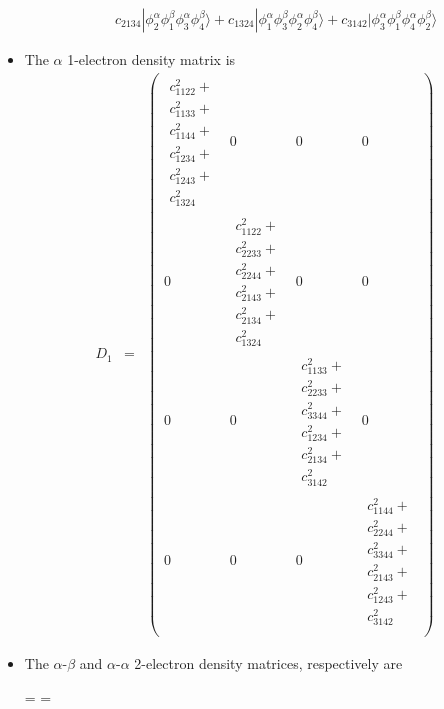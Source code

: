 \documentclass{amsart}
\begin{document}
\begin{itemize}
\begin{eqnarray}
                 &&  c_{2134}|\phi_2^\alpha\phi_1^\beta\phi_3^\alpha\phi_4^\beta\rangle + 
                        c_{1324}|\phi_1^\alpha\phi_3^\beta\phi_2^\alpha\phi_4^\beta\rangle +
                        c_{3142}|\phi_3^\alpha\phi_1^\beta\phi_4^\alpha\phi_2^\beta\rangle
         \end{eqnarray}
\item The $\alpha$ 1-electron density matrix is
         \begin{eqnarray}
         D_1 &=&
         \begin{pmatrix}
         \begin{array}{l}
         c_{1122}^2+ \\
         c_{1133}^2+ \\
         c_{1144}^2+ \\
         c_{1234}^2+ \\
         c_{1243}^2+ \\
         c_{1324}^2 
         \end{array}
         & 0 & 0 & 0 \\
         0 & 
         \begin{array}{l}
         c_{1122}^2+ \\
         c_{2233}^2+ \\
         c_{2244}^2+ \\
         c_{2143}^2+ \\
         c_{2134}^2+ \\
         c_{1324}^2
         \end{array}
         & 0 & 0 \\
         0 & 0 &
         \begin{array}{l}
         c_{1133}^2+ \\
         c_{2233}^2+ \\
         c_{3344}^2+ \\
         c_{1234}^2+ \\
         c_{2134}^2+ \\
         c_{3142}^2
         \end{array}
         & 0 \\
         0 & 0 & 0 &
         \begin{array}{l}
         c_{1144}^2+ \\
         c_{2244}^2+ \\
         c_{3344}^2+ \\
         c_{2143}^2+ \\
         c_{1243}^2+ \\
         c_{3142}^2
         \end{array} \\
         \end{pmatrix}
         \end{eqnarray}
\item The $\alpha$-$\beta$ and $\alpha$-$\alpha$ 2-electron density matrices, respectively are
         \eject
         \pdfpagewidth=16.5in
         \pdfpageheight=11.7in
         \tiny
         
         
         \normalsize
         \eject
         \pdfpagewidth=\classpagewidth
         \pdfpageheight=\classpageheight
\end{itemize}
\end{document}
